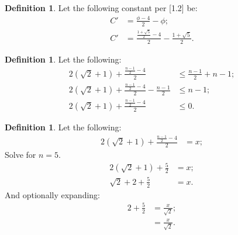 \documentclass[10pt]{article}
\theoremstyle{plain}
\theoremstyle{definition}
\newtheorem{definition}[theorem]{Definition}
\theoremstyle{remark}
\begin{document}
	\begin{definition}
		Let the following constant per [1.2] be:
		\begin{align*}
			C' &= \frac{\phi - 4}{2} - \phi;\\
			C' &= \frac{\frac{1+\sqrt{5}}{2} - 4}{2} - \frac{1+\sqrt{5}}{2}.
		\end{align*}
	\end{definition}
	
	\begin{definition}
		Let the following:
		\begin{align*}
			2(\sqrt{2} + 1) + \frac{\frac{n - 1}{2} - 4}{2}  &\leq \frac{n - 1}{2} + n - 1;\\
			2(\sqrt{2} + 1) + \frac{\frac{n - 1}{2} - 4}{2} - \frac{n - 1}{2} &\leq n - 1;\\
			2(\sqrt{2} + 1) + \frac{\frac{n - 1}{2} - 4}{2} &\leq 0.
		\end{align*}
	\end{definition}
	
	\begin{definition}
		Let the following:
		\begin{align*}
			2(\sqrt{2} + 1) + \frac{\frac{n - 1}{2} - 4}{2} &= x;
		\end{align*}
		Solve for $n=5.$
		\begin{align*}
			2(\sqrt{2} + 1) + \frac{5}{2} &= x;\\
			\sqrt{2}+2 + \frac{5}{2} &= x.
		\end{align*}
		And optionally expanding:
		\begin{align*}
			2+\frac{5}{2} &= \frac{x}{\sqrt{2}};\\
			&= \frac{x}{\sqrt{2}}.
		\end{align*}
	\end{definition}
	
	\nocite{*}
	
	
	
	
\end{document}
